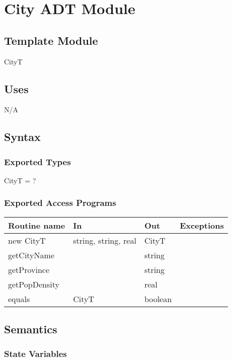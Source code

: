 \documentclass[12pt]{article}
\begin{document}
\newpage

\section* {City ADT Module}

\subsection* {Template Module}

CityT

\subsection* {Uses}

N/A

\subsection* {Syntax}

\subsubsection* {Exported Types}

CityT = ?


\subsubsection* {Exported Access Programs}

\begin{tabular}{| l | l | l | p{6cm} |}
\hline
\textbf{Routine name} & \textbf{In} & \textbf{Out} & \textbf{Exceptions}\\
\hline
new CityT & string, string, real & CityT & \\
\hline
getCityName & ~ & string & \\
\hline
getProvince &~ & string & \\
\hline
getPopDensity & ~ & real & \\
\hline
equals & CityT & boolean & \\
\hline

\end{tabular}

\subsection* {Semantics}

\subsubsection* {State Variables}
\end{document}
